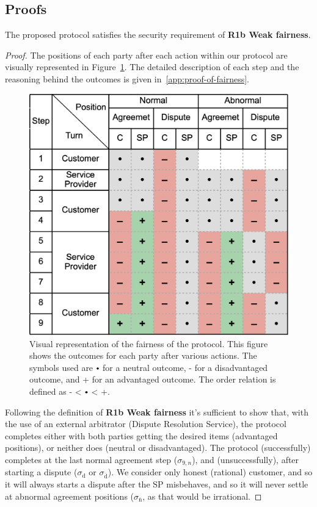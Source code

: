 \documentclass[pdftex,twocolumn,epjc3]{svjour3}
\newcommand{\dispute}{\mathrm{d}}
\newcommand{\abnormal}{\overline{\mathrm{n}}}
\newcommand{\abdispute}{\overline{\mathrm{d}}}
\newcommand{\plus}{+}
\newcommand{\minus}{-}
\newcommand\neutral[1][.75]{\mathbin{\ThisStyle{\vcenter{\hbox{%
  \scalebox{#1}{$\SavedStyle\bullet$}}}}}%
}
\begin{document}
\subsection{Proofs}\label{sec:proofs}

\begin{theorem}
The proposed protocol satisfies the security requirement of \textbf{R1b Weak fairness}.  
\end{theorem}

\begin{proof} 
The positions of each party after each action within our protocol are visually represented in Figure~\ref{fig:positions}. The detailed description of each step and the reasoning behind the outcomes is given in~\ref{app:proof-of-fairness}.

\begin{figure}[h!]
\includegraphics[width=\linewidth]{model.png}
\centering
\caption{Visual representation of the fairness of the protocol. This figure shows the outcomes for each party after various actions. The symbols used are $\neutral{}$ for a neutral outcome, \minus{} for a disadvantaged outcome, and \plus{} for an advantaged outcome. The order relation is defined as \minus{} < $\neutral{}$ < \plus{}.}
\label{fig:positions}
\end{figure}

Following the definition of \textbf{R1b Weak fairness} it's sufficient to show that, with the use of an external arbitrator (Dispute Resolution Service), the protocol completes either with both parties getting the desired items (advantaged positions), or neither does (neutral or disadvantaged).
The protocol (successfully) completes at the last normal agreement step ($\sigma_{9,n}$), and (unsuccessfully), after starting a dispute ($\sigma_{\dispute}$ or $\sigma_{\abdispute}$). 
We consider only honest (rational) customer, and so it will always starts a dispute after the SP misbehaves, and so it will never settle at abnormal agreement positions ($\sigma_{\abnormal}$, as that would be irrational.

\end{proof}
\end{document}
